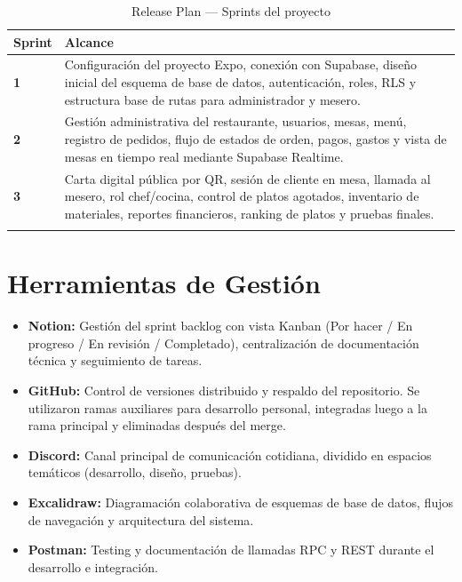 \begin{longtable}{>{\bfseries}p{1.5cm} p{11.5cm}}
  \toprule
  \textbf{Sprint} & \textbf{Alcance} \\
  \midrule
  \endhead

  1 & Configuración del proyecto Expo, conexión con Supabase, diseño inicial
      del esquema de base de datos, autenticación, roles, RLS y estructura base
      de rutas para administrador y mesero. \\[4pt]

  2 & Gestión administrativa del restaurante, usuarios, mesas, menú, registro
      de pedidos, flujo de estados de orden, pagos, gastos y vista de mesas en
      tiempo real mediante Supabase Realtime. \\[4pt]

  3 & Carta digital pública por QR, sesión de cliente en mesa, llamada al mesero,
      rol chef/cocina, control de platos agotados, inventario de materiales,
      reportes financieros, ranking de platos y pruebas finales. \\

  \bottomrule
  \caption{Release Plan — Sprints del proyecto}
\end{longtable}

\section{Herramientas de Gestión}

\begin{itemize}[leftmargin=1.5em]
  \item \textbf{Notion:} Gestión del sprint backlog con vista Kanban
        (Por hacer / En progreso / En revisión / Completado),
        centralización de documentación técnica y seguimiento de tareas.
  \item \textbf{GitHub:} Control de versiones distribuido y respaldo del repositorio.
        Se utilizaron ramas auxiliares para desarrollo personal, integradas luego
        a la rama principal y eliminadas después del merge.
  \item \textbf{Discord:} Canal principal de comunicación cotidiana,
        dividido en espacios temáticos (desarrollo, diseño, pruebas).
  \item \textbf{Excalidraw:} Diagramación colaborativa de esquemas de base de
        datos, flujos de navegación y arquitectura del sistema.
  \item \textbf{Postman:} Testing y documentación de llamadas RPC y REST
        durante el desarrollo e integración.
\end{itemize}

